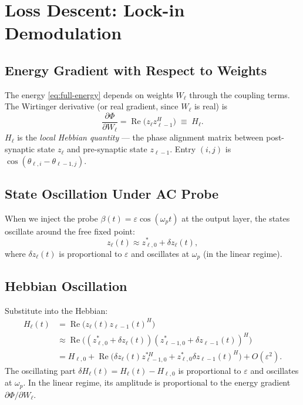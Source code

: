 \documentclass[11pt]{article}
\DeclareMathOperator{\Real}{Re}
\begin{document}
\section{Loss Descent: Lock-in Demodulation}\label{sec:loss-descent}

\subsection{Energy Gradient with Respect to Weights}

The energy \eqref{eq:full-energy} depends on weights $W_\ell$ through the coupling terms. The Wirtinger derivative (or real gradient, since $W_\ell$ is real) is
\begin{equation}\label{eq:energy-weight-grad}
\frac{\partial \Phi}{\partial W_\ell} = \Real\big( z_\ell z_{\ell-1}^H \big) \;\equiv\; H_\ell.
\end{equation}
$H_\ell$ is the \emph{local Hebbian quantity} — the phase alignment matrix between post-synaptic state $z_\ell$ and pre-synaptic state $z_{\ell-1}$. Entry $(i,j)$ is $\cos(\theta_{\ell,i} - \theta_{\ell-1,j})$.

\subsection{State Oscillation Under AC Probe}

When we inject the probe $\beta(t) = \varepsilon\cos(\omega_p t)$ at the output layer, the states oscillate around the free fixed point:
\begin{equation}
z_\ell(t) \approx z_{\ell,0}^* + \delta z_\ell(t),
\end{equation}
where $\delta z_\ell(t)$ is proportional to $\varepsilon$ and oscillates at $\omega_p$ (in the linear regime).

\subsection{Hebbian Oscillation}

Substitute into the Hebbian:
\begin{align}
H_\ell(t) &= \Real\big( z_\ell(t) z_{\ell-1}(t)^H \big) \\
&\approx \Real\big( (z_{\ell,0}^* + \delta z_\ell(t)) (z_{\ell-1,0}^* + \delta z_{\ell-1}(t))^H \big) \\
&= H_{\ell,0} + \Real\big( \delta z_\ell(t) z_{\ell-1,0}^{*H} + z_{\ell,0}^* \delta z_{\ell-1}(t)^H \big) + O(\varepsilon^2).
\end{align}
The oscillating part $\delta H_\ell(t) = H_\ell(t) - H_{\ell,0}$ is proportional to $\varepsilon$ and oscillates at $\omega_p$. In the linear regime, its amplitude is proportional to the energy gradient $\partial\Phi/\partial W_\ell$.
\end{document}

